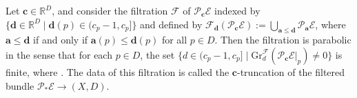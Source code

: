 Let $\boldsymbol{c}\in \mathbb{R}^{D}$, and consider the filtration $\mathcal{F}$ of $\mathcal{P}_{\boldsymbol{c}}\mathcal{E}$ indexed by $\bigl\{\boldsymbol{d}\in \mathbb{R}^{D} \mid \boldsymbol{d}(p)\in (c_p-1,c_p] \bigr\}$ and defined by $\mathcal{F}_{\boldsymbol{d}}(\mathcal{P}_{\boldsymbol{c}}\mathcal{E}):=\bigcup_{\boldsymbol{a}\leq \boldsymbol{d}}\mathcal{P}_{\boldsymbol{a}}\mathcal{E}$, where $\boldsymbol{a}\leq \boldsymbol{d}$ if and only if $\boldsymbol{a}(p)\leq \boldsymbol{d}(p)$ for all $p\in D$. Then the filtration is parabolic in the sense that for each $p \in D$, the set $\bigl\{d\in (c_p-1,c_p] \mid \text{Gr}^{\mathcal{F}}_d(\mathcal{P}_{\boldsymbol{c}}\mathcal{E}|_p)\neq 0\bigr\}$ is finite, where . The data of this filtration is called the $\boldsymbol{c}$-truncation of the filtered bundle $\mathcal{P}_{*}\mathcal{E}\to (X,D)$.

